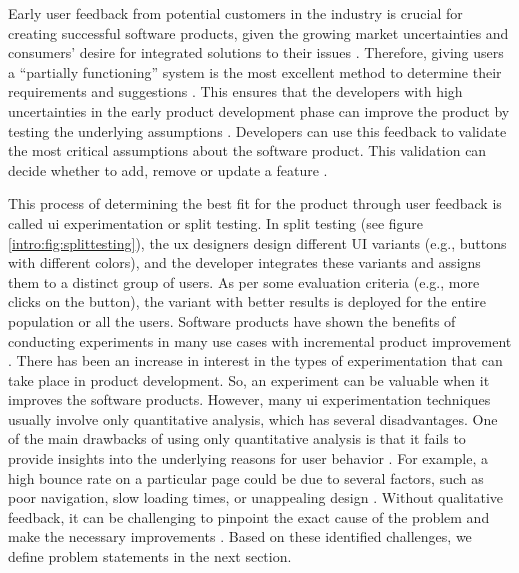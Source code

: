 Early user feedback from potential customers in the industry is crucial for creating successful software products, given the growing market uncertainties and consumers' desire for integrated solutions to their issues \cite{misc:businessmodels:teece}.
Therefore, giving users a ``partially functioning'' system is the most excellent method to determine their requirements and suggestions \cite{journal:prototyping:davis}.
This ensures that the developers with high uncertainties in the early product development phase can improve the product by testing the underlying assumptions \cite{misc:lean:steve}.
Developers can use this feedback to validate the most critical assumptions about the software product. 
This validation can decide whether to add, remove or update a feature \cite{article:experiments:lindgren}. 

This process of determining the best fit for the product through user feedback is called \ac{ui} experimentation or split testing.
In split testing (see figure \ref{intro:fig:splittesting}), the \ac{ux} designers design different UI variants (e.g., buttons with different colors), and the developer integrates these variants and assigns them to a distinct group of users. 
As per some evaluation criteria (e.g., more clicks on the button), the variant with better results is deployed for the entire population or all the users.
Software products have shown the benefits of conducting experiments in many use cases with incremental product improvement \cite{article:controlled:experiements}.
There has been an increase in interest in the types of experimentation that can take place in product development. 
So, an experiment can be valuable when it improves the software products.
However, many \ac{ui} experimentation techniques \cite{article:controlled:experiements, article:experiments:lindgren} usually involve only quantitative analysis, which has several disadvantages. 
One of the main drawbacks of using only quantitative analysis is that it fails to provide insights into the underlying reasons for user behavior \cite{article:qqa:young}. 
For example, a high bounce rate on a particular page could be due to several factors, such as poor navigation, slow loading times, or unappealing design \cite{article:right:model}. 
Without qualitative feedback, it can be challenging to pinpoint the exact cause of the problem and make the necessary improvements \cite{article:qq:helena}.
Based on these identified challenges, we define problem statements in the next section.


